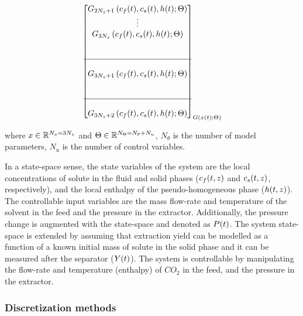 \documentclass[../Article_Sensitivity_Analsysis.tex]{subfiles}
\begin{document}
{\begin{align*}
{\begin{bmatrix}
							{\color{black}G_{2N_z+1}} \left( {\color{black}c_f}(t),{\color{black}c_s}(t),{\color{black}h}(t); {\color{black}\Theta} \right) \\
							\vdots\\
							{\color{black}G_{3N_z}} \left( {\color{black}c_f}(t),{\color{black}c_s}(t),{\color{black}h}(t); {\color{black}\Theta} \right) \\ 
							\\ \\ \hline \\
							{\color{black}G_{3N_z+1}} \left( {\color{black}c_f}(t),{\color{black}c_s}(t),{\color{black}h}(t); {\color{black}\Theta} \right) \\
							\\ \\ \hline \\
							{\color{black}G_{3N_z+2}} \left( {\color{black}c_f}(t),{\color{black}c_s}(t),{\color{black}h}(t); {\color{black}\Theta} \right) 
					\end{bmatrix}}_{{\color{black}G} \left( {\color{black}x}(t); {\color{black}\Theta} \right)} 
			\end{align*} }
			
			where ${\color{black}x} \in \mathbb{R}^{N_x = 3N_z} $ and ${\color{black}\Theta} \in \mathbb{R}^{N_\Theta =  N_{\theta} + N_u } $, $N_{\theta}$ is the number of model parameters, $N_{u}$ is the number of control variables.
			
			In a state-space sense, the state variables of the system are the local concentrations of solute in the fluid and solid phases (${\color{black}c_f}(t,z)$ and ${\color{black}c_s}(t,z)$, respectively), and the local enthalpy of the pseudo-homogeneous phase (${\color{black}h}(t,z)$). The controllable input variables are the mass flow-rate and temperature of the solvent in the feed and the pressure in the extractor. Additionally, the pressure change is augmented with the state-space and denoted as ${\color{black}P}(t)$.
			The system state-space is extended by assuming that extraction yield can be modelled as a function of a known initial mass of solute in the solid phase and it can be measured after the separator (${\color{black}Y}(t)$). The system is controllable by manipulating the flow-rate and temperature (enthalpy) of $CO_2$ in the feed, and the pressure in the extractor.
			
			\subsubsection{Discretization methods}
			
\end{document}
